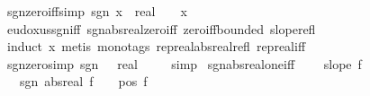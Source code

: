 \begin{isabellebody}
\isamarkupfalse%
\ sgn{\isacharunderscore}{\kern0pt}zero{\isacharunderscore}{\kern0pt}iff{\isacharbrackleft}{\kern0pt}simp{\isacharbrackright}{\kern0pt}{\isacharcolon}{\kern0pt}\ {\isachardoublequoteopen}sgn\ {\isacharparenleft}{\kern0pt}x\ {\isacharcolon}{\kern0pt}{\isacharcolon}{\kern0pt}\ real{\isacharparenright}{\kern0pt}\ {\isacharequal}{\kern0pt}\ {}\ {\isasymlongleftrightarrow}\ x\ {\isacharequal}{\kern0pt}\ {}{\isachardoublequoteclose}\isanewline
%
\isadelimproof
\ \ %
\endisadelimproof
%
\isatagproof
{}\isamarkupfalse%
\ eudoxus{\isacharunderscore}{\kern0pt}sgn{\isacharunderscore}{\kern0pt}iff{\isacharparenleft}{\kern0pt}{}{\isacharparenright}{\kern0pt}\ sgn{\isacharunderscore}{\kern0pt}abs{\isacharunderscore}{\kern0pt}real{\isacharunderscore}{\kern0pt}zero{\isacharunderscore}{\kern0pt}iff\ zero{\isacharunderscore}{\kern0pt}iff{\isacharunderscore}{\kern0pt}bounded{\isacharprime}{\kern0pt}\ slope{\isacharunderscore}{\kern0pt}refl\isanewline
\ \ \isamarkupfalse%
\ {\isacharparenleft}{\kern0pt}induct\ x{\isacharparenright}{\kern0pt}\ {\isacharparenleft}{\kern0pt}metis\ {\isacharparenleft}{\kern0pt}mono{\isacharunderscore}{\kern0pt}tags{\isacharparenright}{\kern0pt}\ rep{\isacharunderscore}{\kern0pt}real{\isacharunderscore}{\kern0pt}abs{\isacharunderscore}{\kern0pt}real{\isacharunderscore}{\kern0pt}refl\ rep{\isacharunderscore}{\kern0pt}real{\isacharunderscore}{\kern0pt}iff{\isacharparenright}{\kern0pt}%
\endisatagproof
{\isafoldproof}%
%
\isadelimproof
\isanewline
%
\endisadelimproof
\isanewline
{}\isamarkupfalse%
\ sgn{\isacharunderscore}{\kern0pt}zero{\isacharbrackleft}{\kern0pt}simp{\isacharbrackright}{\kern0pt}{\isacharcolon}{\kern0pt}\ {\isachardoublequoteopen}sgn\ {\isacharparenleft}{\kern0pt}{}\ {\isacharcolon}{\kern0pt}{\isacharcolon}{\kern0pt}\ real{\isacharparenright}{\kern0pt}\ {\isacharequal}{\kern0pt}\ {}{\isachardoublequoteclose}%
\isadelimproof
\ %
\endisadelimproof
%
\isatagproof
{}\isamarkupfalse%
\ simp%
\endisatagproof
{\isafoldproof}%
%
\isadelimproof
%
\endisadelimproof
\isanewline
\isanewline
{}\isamarkupfalse%
\ sgn{\isacharunderscore}{\kern0pt}abs{\isacharunderscore}{\kern0pt}real{\isacharunderscore}{\kern0pt}one{\isacharunderscore}{\kern0pt}iff{\isacharcolon}{\kern0pt}\ \isanewline
\ \ \ {\isachardoublequoteopen}slope\ f{\isachardoublequoteclose}\isanewline
\ \ \ {\isachardoublequoteopen}sgn\ {\isacharparenleft}{\kern0pt}abs{\isacharunderscore}{\kern0pt}real\ f{\isacharparenright}{\kern0pt}\ {\isacharequal}{\kern0pt}\ {}\ {\isasymlongleftrightarrow}\ pos\ f{\isachardoublequoteclose}\isanewline

\end{isabellebody}

